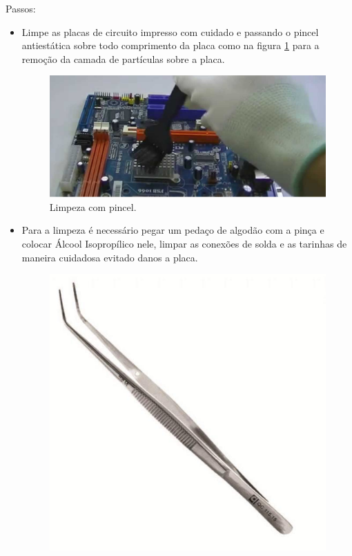 \par Passos:
\begin{itemize}
    \item Limpe as placas de circuito impresso com cuidado e passando o pincel antiestática sobre todo comprimento da placa como na figura \ref{fig:pincel} para a remoção da camada de partículas sobre a placa.
    \begin{figure}[H]
  \centering
  \includegraphics[width=\textwidth]{Figuras/pincel.png}
  \caption{Limpeza com pincel.} 
  \label{fig:pincel}
\end{figure}
\item Para a limpeza é necessário pegar um pedaço de algodão com a pinça e colocar Álcool Isopropílico nele, limpar as conexões de solda e as tarinhas de maneira cuidadosa evitado danos a placa. 
    \begin{figure}[H]
  \centering
  \includegraphics[scale=0.2]{Figuras/Pinca-para-Algodao-Quinelato.jpg}

\end{figure}
\end{itemize}
